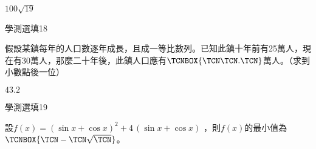 \begin{QUESTIONS}
\begin{QUESTION}
\begin{QBODY}
        \end{QBODY}
        \begin{QFROMS}
        \end{QFROMS}
        \begin{QTAGS}\end{QTAGS}
        \begin{QANS}
            $100\sqrt{19}$
        \end{QANS}
        \begin{QSOLLIST}
        \end{QSOLLIST}
        \begin{QEMPTYSPACE}
        \end{QEMPTYSPACE}
    \end{QUESTION}
    \begin{QUESTION}
        \begin{ExamInfo}{84}{學測}{選填}{18}
        \end{ExamInfo}
        \begin{ExamAnsRateInfo}{}{}{}{}
        \end{ExamAnsRateInfo}
        \begin{QBODY}
            假設某鎮每年的人口數逐年成長，且成一等比數列。已知此鎮十年前有25萬人，現在有30萬人，那麼二十年後，此鎮人口應有$\TCNBOX{\TCN\TCN.\TCN}$萬人。（求到小數點後一位）
        \end{QBODY}
        \begin{QFROMS}
        \end{QFROMS}
        \begin{QTAGS}\end{QTAGS}
        \begin{QANS}
            $43.2$
        \end{QANS}
        \begin{QSOLLIST}
        \end{QSOLLIST}
        \begin{QEMPTYSPACE}
        \end{QEMPTYSPACE}
    \end{QUESTION}
    \begin{QUESTION}
        \begin{ExamInfo}{84}{學測}{選填}{19}
        \end{ExamInfo}
        \begin{ExamAnsRateInfo}{}{}{}{}
        \end{ExamAnsRateInfo}
        \begin{QBODY}
            	設$ f\left( x \right)={{\left( \sin x+\cos x \right)}^{2}}+4\,\left( \sin x+\cos x \right)$ ，則$f\left( x \right)$的最小值為$\TCNBOX{\TCN - \TCN \sqrt{\TCN}}$。


\end{QBODY}
\end{QUESTION}
\end{QUESTIONS}
